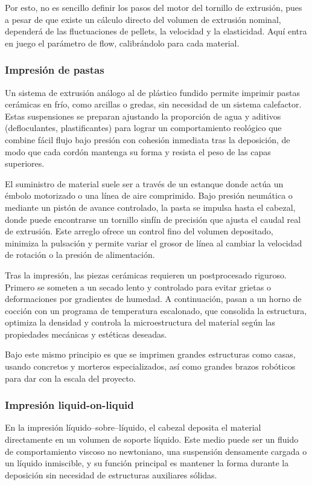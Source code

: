 Por esto, no es sencillo definir los pasos del motor del tornillo de extrusión, pues a pesar de que existe un cálculo directo del volumen de extrusión nominal, dependerá de las fluctuaciones de pellets, la velocidad y la elasticidad. Aquí entra en juego el parámetro de flow, calibrándolo para cada material.

\subsubsection{Impresión de pastas}

Un sistema de extrusión análogo al de plástico fundido permite imprimir pastas cerámicas en frío, como arcillas o gredas, sin necesidad de un sistema calefactor. Estas suspensiones se preparan ajustando la proporción de agua y aditivos (defloculantes, plastificantes) para lograr un comportamiento reológico que combine fácil flujo bajo presión con cohesión inmediata tras la deposición, de modo que cada cordón mantenga su forma y resista el peso de las capas superiores.

El suministro de material suele ser a través de un estanque donde actúa un émbolo motorizado o una línea de aire comprimido. Bajo presión neumática o mediante un pistón de avance controlado, la pasta se impulsa hasta el cabezal, donde puede encontrarse un tornillo sinfín de precisión que ajusta el caudal real de extrusión. Este arreglo ofrece un control fino del volumen depositado, minimiza la pulsación y permite variar el grosor de línea al cambiar la velocidad de rotación o la presión de alimentación.

Tras la impresión, las piezas cerámicas requieren un postprocesado riguroso. Primero se someten a un secado lento y controlado para evitar grietas o deformaciones por gradientes de humedad. A continuación, pasan a un horno de cocción con un programa de temperatura escalonado, que consolida la estructura, optimiza la densidad y controla la microestructura del material según las propiedades mecánicas y estéticas deseadas.

Bajo este mismo principio es que se imprimen grandes estructuras como casas, usando concretos y morteros especializados, así como grandes brazos robóticos para dar con la escala del proyecto.

\subsubsection{Impresión liquid-on-liquid}

En la impresión líquido–sobre–líquido, el cabezal deposita el material directamente en un volumen de soporte líquido. Este medio puede ser un fluido de comportamiento viscoso no newtoniano, una suspensión densamente cargada o un líquido inmiscible, y su función principal es mantener la forma durante la deposición sin necesidad de estructuras auxiliares sólidas.

